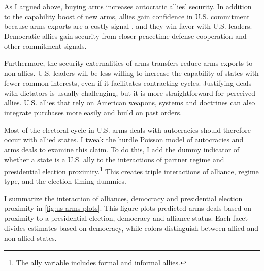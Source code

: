 \documentclass[12pt]{article}
\begin{document}


As I argued above, buying arms increases autocratic allies' security.
In addition to the capability boost of new arms, allies gain confidence in U.S. commitment because arms exports are a costly signal \citep{McManusYarhi-Milo2017}, and they win favor with U.S. leaders. 
Democratic allies gain security from closer peacetime defense cooperation and other commitment signals.


Furthermore, the security externalities of arms transfers reduce arms exports to non-allies. 
U.S. leaders will be less willing to increase the capability of states with fewer common interests, even if it facilitates contracting cycles.
Justifying deals with dictators is usually challenging, but it is more straightforward for perceived allies. 
U.S. allies that rely on American weapons, systems and doctrines can also integrate purchases more easily and build on past orders. 



Most of the electoral cycle in U.S. arms deals with autocracies should therefore occur with allied states. 
I tweak the hurdle Poisson model of autocracies and arms deals to examine this claim. 
To do this, I add the dummy indicator of whether a state is a U.S. ally to the interactions of partner regime and presidential election proximity.\footnote{The ally variable includes formal and informal allies.}
This creates triple interactions of alliance, regime type, and the election timing dummies. 


I summarize the interaction of alliances, democracy and presidential election proximity in \autoref{fig:us-arms-plots}.
This figure plots predicted arms deals based on proximity to a presidential election, democracy and alliance status. 
Each facet divides estimates based on democracy, while colors distinguish between allied and non-allied states. 
\end{document}
